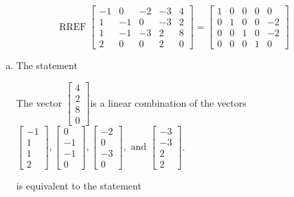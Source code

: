 \begin{exerciseAnswer} 
\[\operatorname{RREF}  \left[\begin{array}{cccc|c}
-1 & 0 & -2 & -3 & 4 \\
1 & -1 & 0 & -3 & 2 \\
1 & -1 & -3 & 2 & 8 \\
2 & 0 & 0 & 2 & 0
\end{array}\right] = \left[\begin{array}{cccc|c}
1 & 0 & 0 & 0 & 0 \\
0 & 1 & 0 & 0 & -2 \\
0 & 0 & 1 & 0 & -2 \\
0 & 0 & 0 & 1 & 0
\end{array}\right] \]
\begin{enumerate}[(a)]
\item  The statement 
\begin{center}\begin{minipage}{0.8\textwidth}
 The vector \( \left[\begin{array}{c}
4 \\
2 \\
8 \\
0
\end{array}\right] \)is a linear combination of the vectors \( \left[\begin{array}{c}
-1 \\
1 \\
1 \\
2
\end{array}\right] , \left[\begin{array}{c}
0 \\
-1 \\
-1 \\
0
\end{array}\right] , \left[\begin{array}{c}
-2 \\
0 \\
-3 \\
0
\end{array}\right] , \text{ and } \left[\begin{array}{c}
-3 \\
-3 \\
2 \\
2
\end{array}\right] \). 
\end{minipage}\end{center}
     is equivalent to the statement 
\begin{center}\begin{minipage}{0.8\textwidth}

\end{minipage}
\end{center}
\end{enumerate}
\end{exerciseAnswer}
